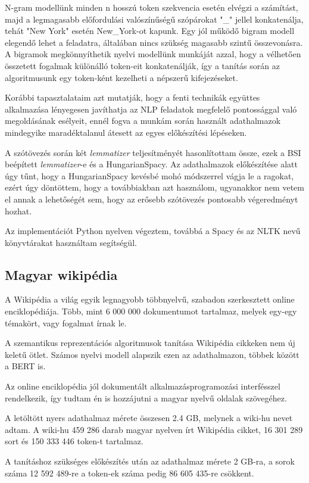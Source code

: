 N-gram modellünk minden n hosszú token szekvencia esetén elvégzi a számítást, majd a legmagasabb előfordulási valószínűségű szópárokat "\_" jellel konkatenálja, tehát "New York" esetén New\_York-ot kapunk. Egy jól működő bigram modell elegendő lehet a feladatra, általában nincs szükség magasabb szintű összevonásra. A bigramok megkönnyíthetik nyelvi modellünk munkáját azzal, hogy a vélhetően összetett fogalmak különálló token-eit konkatenálják, így a tanítás során az algoritmusunk egy token-ként kezelheti a népszerű kifejezéseket.

Korábbi tapasztalataim azt mutatják, hogy a fenti technikák együttes alkalmazása lényegesen javíthatja az NLP feladatok megfelelő pontossággal való megoldásának esélyeit, ennél fogva a munkám során használt adathalmazok mindegyike maradéktalanul átesett az egyes előkészítési lépéseken.

A szótövezés során két \textit{lemmatizer} teljesítményét hasonlítottam össze, ezek a BSI beépített \textit{lemmatizer}-e és a HungarianSpacy. Az adathalmazok előkészítése alatt úgy tűnt, hogy a HungarianSpacy kevésbé mohó módszerrel vágja le a ragokat, ezért úgy döntöttem, hogy a továbbiakban azt használom, ugyanakkor nem vetem el annak a lehetőségét sem, hogy az erősebb szótövezés pontosabb végeredményt hozhat. 

Az implementációt Python nyelven végeztem, továbbá a Spacy és az NLTK nevű könyvtárakat használtam segítségül.

\subsection{Magyar wikipédia}
A Wikipédia \cite{wikipedia} a világ egyik legnagyobb többnyelvű, szabadon szerkesztett online enciklopédiája. Több, mint 6 000 000 dokumentumot tartalmaz, melyek egy-egy témakört, vagy fogalmat írnak le.

A szemantikus reprezentációs algoritmusok tanítása Wikipédia cikkeken nem új keletű ötlet. Számos nyelvi modell alapszik ezen az adathalmazon, többek között a BERT is.

Az online enciklopédia jól dokumentált alkalmazásprogramozási interfésszel rendelkezik, így tudtam én is hozzájutni a magyar nyelvű oldalak szövegéhez.

A letöltött nyers adathalmaz mérete összesen 2.4 GB, melynek a wiki-hu nevet adtam. A wiki-hu 459 286 darab magyar nyelven írt Wikipédia cikket, 16 301 289 sort és 150 333 446 token-t tartalmaz. 

A tanításhoz szükséges előkészítés után az adathalmaz mérete 2 GB-ra, a sorok száma 12 592 489-re a token-ek száma pedig 86 605 435-re csökkent.

